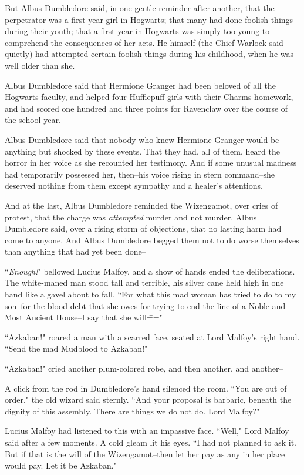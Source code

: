But Albus Dumbledore said, in one gentle reminder after another, that the perpetrator was a first-year girl in Hogwarts; that many had done foolish things during their youth; that a first-year in Hogwarts was simply too young to comprehend the consequences of her acts. He himself (the Chief Warlock said quietly) had attempted certain foolish things during his childhood, when he was well older than she.

Albus Dumbledore said that Hermione Granger had been beloved of all the Hogwarts faculty, and helped four Hufflepuff girls with their Charms homework, and had scored one hundred and three points for Ravenclaw over the course of the school year.

Albus Dumbledore said that nobody who knew Hermione Granger would be anything but shocked by these events. That they had, all of them, heard the horror in her voice as she recounted her testimony. And if some unusual madness had temporarily possessed her, then\---his voice rising in stern command\---she deserved nothing from them except sympathy and a healer's attentions.

And at the last, Albus Dumbledore reminded the Wizengamot, over cries of protest, that the charge was \emph{attempted} murder and not murder. Albus Dumbledore said, over a rising storm of objections, that no lasting harm had come to anyone. And Albus Dumbledore begged them not to do worse themselves than anything that had yet been done\---

``\emph{Enough!}" bellowed Lucius Malfoy, and a show of hands ended the deliberations. The white-maned man stood tall and terrible, his silver cane held high in one hand like a gavel about to fall. ``For what this mad woman has tried to do to my son\---for the blood debt that she owes for trying to end the line of a Noble and Most Ancient House\---I say that she will\==="

``Azkaban!" roared a man with a scarred face, seated at Lord Malfoy's right hand. ``Send the mad Mudblood to Azkaban!"

``Azkaban!" cried another plum-colored robe, and then another, and another\---

A click from the rod in Dumbledore's hand silenced the room. ``You are out of order," the old wizard said sternly. ``And your proposal is barbaric, beneath the dignity of this assembly. There are things we do not do. Lord Malfoy?"

Lucius Malfoy had listened to this with an impassive face. ``Well," Lord Malfoy said after a few moments. A cold gleam lit his eyes. ``I had not planned to ask it. But if that is the will of the Wizengamot\---then let her pay as any in her place would pay. Let it be Azkaban."

